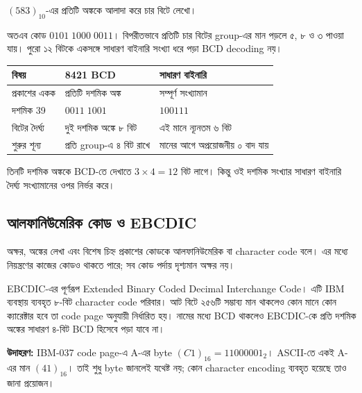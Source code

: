 $(583)_{10}$-এর প্রতিটি অঙ্ককে আলাদা করে চার বিটে লেখো।
\begin{center}\begin{chThreeDiagram}\end{chThreeDiagram}\end{center}
অতএব কোড $0101\;1000\;0011$। বিপরীতভাবে প্রতিটি চার বিটের group-এর মান পড়লে ৫, ৮ ও ৩ পাওয়া যায়। পুরো ১২ বিটকে একসঙ্গে সাধারণ বাইনারি সংখ্যা ধরে পড়া BCD decoding নয়।

\begin{center}\begin{tabularx}{\linewidth}{|L{.24\linewidth}|Y|Y|}\hline
{}বিষয়&8421 BCD&সাধারণ বাইনারি\\\hline
প্রকাশের একক&প্রতিটি দশমিক অঙ্ক&সম্পূর্ণ সংখ্যামান\\\hline
দশমিক 39&$0011\;1001$&$100111$\\\hline
বিটের দৈর্ঘ্য&দুই দশমিক অঙ্কে ৮ বিট&এই মানে ন্যূনতম ৬ বিট\\\hline
শুরুর শূন্য&প্রতি group-এ ৪ বিট রাখে&মানের আগে অপ্রয়োজনীয় ০ বাদ যায়\\\hline
\end{tabularx}\end{center}
তিনটি দশমিক অঙ্ককে BCD-তে দেখাতে $3\times4=12$ বিট লাগে। কিন্তু ওই দশমিক সংখ্যার সাধারণ বাইনারি দৈর্ঘ্য সংখ্যামানের ওপর নির্ভর করে।

\subsection{আলফানিউমেরিক কোড ও EBCDIC}
অক্ষর, অঙ্কের লেখা এবং বিশেষ চিহ্ন প্রকাশের কোডকে আলফানিউমেরিক বা character code বলে। এর মধ্যে নিয়ন্ত্রণের কাজের কোডও থাকতে পারে; সব কোড পর্দায় দৃশ্যমান অক্ষর নয়।

EBCDIC-এর পূর্ণরূপ \textenglish{Extended Binary Coded Decimal Interchange Code}। এটি IBM ব্যবস্থায় ব্যবহৃত ৮-বিট character code পরিবার। আট বিটে ২৫৬টি সম্ভাব্য মান থাকলেও কোন মানে কোন ক্যারেক্টার হবে তা code page অনুযায়ী নির্ধারিত হয়। নামের মধ্যে BCD থাকলেও EBCDIC-কে প্রতি দশমিক অঙ্কের সাধারণ ৪-বিট BCD হিসেবে পড়া যাবে না।

\textbf{উদাহরণ:} IBM-037 code page-এ A-এর byte $(C1)_{16}=11000001_2$। ASCII-তে একই A-এর মান $(41)_{16}$। তাই শুধু byte জানলেই যথেষ্ট নয়; কোন character encoding ব্যবহৃত হয়েছে তাও জানা প্রয়োজন।

